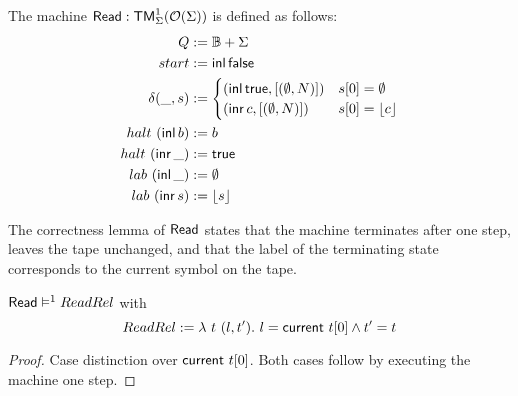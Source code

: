 \begin{definition}[$\MS{Read}$][ReadChar]
  The machine $\mathsf{Read} : \mathsf{TM}_\Sigma^1(\mathcal{O}(\Sigma))$ is defined as follows:
  \begin{align*}
    Q          &:= \mathbb{B}+\Sigma \\
    start      &:= \operatorname{\mathsf{inl}} \mathsf{false} \\
    \delta (\_, s) &:=
                     \begin{cases}
                       (\operatorname{\mathsf{inl}} \mathsf{true}, \left[ (\emptyset, N) \right]) & s[0] = \emptyset \\
                       (\operatorname{\mathsf{inr}} c, \left[ (\emptyset, N) \right])     & s[0] = \left\lfloor {c} \right\rfloor
                     \end{cases} \\
    halt   ~ (\operatorname{\mathsf{inl}}  b) &:= b \\
    halt   ~ (\operatorname{\mathsf{inr}} \_) &:= \mathsf{true} \\
    lab    ~ (\operatorname{\mathsf{inl}} \_) &:= \emptyset \\
    lab    ~ (\operatorname{\mathsf{inr}}  s) &:= \left\lfloor {s} \right\rfloor
  \end{align*}
\end{definition}

The correctness lemma of $\MS{Read}$ states that the machine terminates after one step, leaves the tape unchanged, and that the label of the
terminating state corresponds to the current symbol on the tape.

\begin{lemma}
  \label{lem:Read_Sem} $\mathsf{Read} \mathrel{\vDash^{1}} ReadRel$ with
  \[
    ReadRel := \lambda~t~(l,t').~ l = \mathsf{current}~t[0] \land t' = t
  \]
\end{lemma}
\begin{proof}
  Case distinction over $\mathsf{current}~t[0]$.  Both cases follow by executing the machine one step.
\end{proof}


